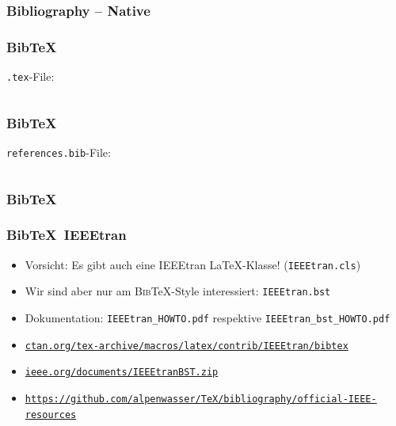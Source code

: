 \documentclass{beamer}                %
\newcommand*\code[1]{\texttt{#1}}
\begin{document}
\begin{frame} %
    \frametitle{Bibliography -- Native}

\end{frame}%

\begin{frame}[fragile] %
    \frametitle{Bib\TeX}

    \code{.tex}-File:

    \inputminted{tex}{code/bibtex.tex}
\end{frame}

\begin{frame}[fragile] %
    \frametitle{Bib\TeX}

    \code{references.bib}-File:

    \inputminted{tex}{code/references.bib}
\end{frame}

\begin{frame} %
    \frametitle{Bib\TeX}

\end{frame}%

\begin{frame} %
    \frametitle{Bib\TeX\ IEEEtran}

    \begin{itemize}
        \item
            \alert{Vorsicht:} Es    gibt     auch    eine    \textsf{IEEEtran}
            \LaTeX-Klasse! (\code{IEEEtran.cls})
        \item
            Wir   sind  aber   nur  am   \textsc{Bib}\TeX-Style  interessiert:
            \code{IEEEtran.\alert{bst}}
        \item
            Dokumentation:         \code{IEEEtran\_HOWTO.pdf}        respektive
            \code{IEEEtran\_bst\_HOWTO.pdf}
        \item
            \href{http://ctan.org/tex-archive/macros/latex/contrib/IEEEtran/bibtex}
                 {\nolinkurl{ctan.org/tex-archive/macros/latex/contrib/IEEEtran/bibtex}}
        \item
            \href{http://www.ieee.org/documents/IEEEtranBST.zip}
                 {\nolinkurl{ieee.org/documents/IEEEtranBST.zip}}
        \item
            \href{https://github.com/alpenwasser/TeX/tree/master/bibliography/official-IEEE-resources}
                 {\nolinkurl{https://github.com/alpenwasser/TeX/bibliography/official-IEEE-resources}}
    \end{itemize}
\end{frame}%
\end{document}
